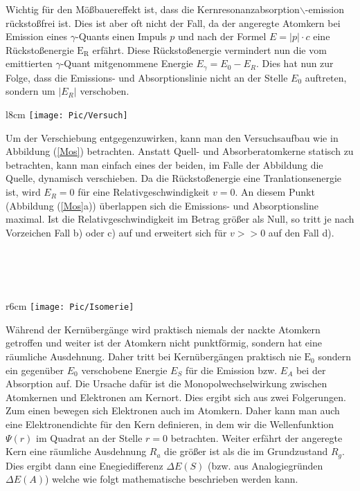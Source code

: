 \documentclass[10pt,twoside]{article}
\renewcommand{\1}{^{-1}}
\renewcommand{\2}{^{-2}}
\newcommand{\3}{^{-3}}
\newcommand{\4}{^{-4}}
\newcommand{\5}{^{-5}}
\newcommand{\6}{^{-6}}
\newcommand{\7}{^{-7}}
\newcommand{\8}{^{-8}}
\newcommand{\9}{^{-9}}
\begin{document}
Wichtig für den Mößbauereffekt ist, dass die Kernresonanzabsorption$\backslash$-emission rückstoßfrei ist. Dies ist aber oft nicht der Fall, da der angeregte Atomkern bei Emission eines $\gamma$-Quants einen Impuls $p$ und nach der Formel $E=\vert p \vert \cdot c$ eine Rückstoßenergie $\text{E}_{\text{R}}$ erfährt. Diese Rückstoßenergie vermindert nun die vom emittierten $\gamma$-Quant mitgenommene Energie ${E}_{\gamma} = {E}_0 - {E}_{{R}}$. Dies hat nun zur Folge, dass die Emissions- und Absorptionslinie nicht an der Stelle ${E}_0$ auftreten, sondern um $\vert {E}_{{R}} \vert$ verschoben. 
\newpage
\begin{minipage}[t]{\textwidth}
\begin{wrapfigure}{l}{8cm}
\vspace{-20pt}
\texttt{[image: Pic/Versuch]}
\caption{Prinzip Mößbauereffekt${^{\cite{1}}}$}
\label{Mos}
\end{wrapfigure}
Um der Verschiebung entgegenzuwirken, kann man den Versuchsaufbau wie in Abbildung (\ref{Mos}) betrachten.
Anstatt Quell- und Absorberatomkerne statisch zu betrachten, kann man einfach eines der beiden, im Falle der Abbildung die Quelle, dynamisch verschieben. Da die Rückstoßenergie eine Tranlationsenergie ist, wird ${E}_{{R}}=0$ für eine Relativgeschwindigkeit $v=0$. An diesem Punkt (Abbildung (\ref{Mos}a)) überlappen sich die Emissions- und Absorptionsline maximal. Ist die Relativgeschwindigkeit im Betrag größer als Null, so tritt je nach Vorzeichen Fall b) oder c) auf und erweitert sich für $v>>0$ auf den Fall d).\par
\end{minipage} \\
~\\
\vspace{150pt}~\\
\begin{minipage}[t]{\textwidth}
\begin{wrapfigure}{r}{6cm}
\texttt{[image: Pic/Isomerie]}
\caption{Mößbauerspektrum von $\text{K}_4[\text{Fe(CN)}_6]\cdot 3\text{H}_2\text{O}$~${^{\cite{1}}}$}
\label{Iso}
\end{wrapfigure}
Während der Kernübergänge wird praktisch niemals der nackte Atomkern getroffen und weiter ist der Atomkern nicht punktförmig, sondern hat eine räumliche Ausdehnung. Daher tritt bei Kernübergängen praktisch nie $\text{E}_0$ sondern ein gegenüber ${E}_0$ verschobene Energie ${E}_{{S}}$ für die Emission bzw. ${E}_{{A}}$ bei der Absorption auf. Die Ursache dafür ist die Monopolwechselwirkung zwischen Atomkernen und Elektronen am Kernort. Dies ergibt sich aus zwei Folgerungen. Zum einen bewegen sich Elektronen auch im Atomkern. Daher kann man auch eine Elektronendichte für den Kern definieren, in dem wir die Wellenfunktion $\Psi(r)$ im Quadrat an der Stelle $r=0$ betrachten. Weiter erfährt der angeregte Kern eine räumliche Ausdehnung ${R}_{{a}}$ die größer ist als die im Grundzustand ${R}_{{g}}$. Dies ergibt dann eine Enegiedifferenz $\Delta E(S)$ (bzw. aus Analogiegründen $\Delta E(A)$) welche wie folgt mathematische beschrieben werden kann.
\end{minipage}
\end{document}
